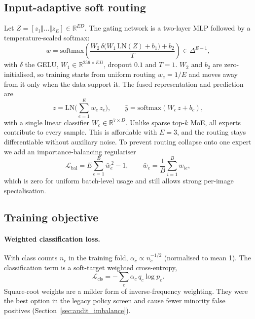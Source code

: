 \subsection{Input-adaptive soft routing}
\label{sec:method_router}

Let $Z=[z_1\Vert\dots\Vert z_E]\in\mathbb{R}^{ED}$. The gating network is a two-layer
MLP followed by a temperature-scaled softmax:
\begin{equation}
w = \mathrm{softmax}\!\left(\frac{W_2\,\delta\!\big(W_1\,\mathrm{LN}(Z)+b_1\big)+b_2}{T}\right)\in\Delta^{E-1},
\end{equation}
with $\delta$ the GELU, $W_1\in\mathbb{R}^{256\times ED}$, dropout $0.1$ and $T=1$.
$W_2$ and $b_2$ are zero-initialised, so training starts from uniform routing
$w_e=1/E$ and moves away from it only when the data support it. The fused
representation and prediction are
\begin{equation}
z = \mathrm{LN}\Big(\sum_{e=1}^{E} w_e\, z_e\Big),\qquad
\hat{y} = \mathrm{softmax}(W_c\, z + b_c),
\end{equation}
with a single linear classifier $W_c\in\mathbb{R}^{7\times D}$. Unlike sparse
top-$k$ MoE, all experts contribute to every sample. This is affordable with
$E=3$, and the routing stays differentiable without auxiliary noise. To prevent
routing collapse onto one expert we add an importance-balancing regulariser
\begin{equation}
\mathcal{L}_{\mathrm{bal}} = E\sum_{e=1}^{E}\bar{w}_e^{\,2} - 1,\qquad
\bar{w}_e = \frac{1}{B}\sum_{i=1}^{B} w_{ie},
\end{equation}
which is zero for uniform batch-level usage and still allows strong per-image
specialisation.

\subsection{Training objective}
\label{sec:method_loss}

\paragraph{Weighted classification loss.}
With class counts $n_c$ in the training fold, $\alpha_c \propto n_c^{-1/2}$
(normalised to mean 1). The classification term is a soft-target weighted
cross-entropy,
\begin{equation}
\mathcal{L}_{\mathrm{cls}} = -\sum_c \alpha_c\, q_c \log p_c .
\end{equation}
Square-root weights are a milder form of inverse-frequency weighting. They were
the best option in the legacy policy screen and cause fewer minority false
positives (Section~\ref{sec:audit_imbalance}).

